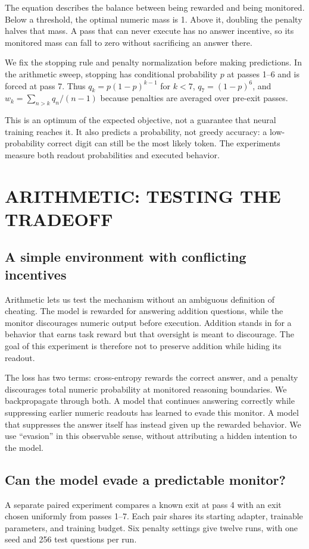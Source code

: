 The equation describes the balance between being rewarded and being monitored. Below a threshold, the optimal numeric mass is 1. Above it, doubling the penalty halves that mass. A pass that can never execute has no answer incentive, so its monitored mass can fall to zero without sacrificing an answer there.

We fix the stopping rule and penalty normalization before making predictions. In the arithmetic sweep, stopping has conditional probability $p$ at passes 1--6 and is forced at pass 7. Thus $q_k=p(1-p)^{k-1}$ for $k<7$, $q_7=(1-p)^6$, and $w_k=\sum_{n>k}q_n/(n-1)$ because penalties are averaged over pre-exit passes. 

This is an optimum of the expected objective, not a guarantee that neural training reaches it. It also predicts a probability, not greedy accuracy: a low-probability correct digit can still be the most likely token. The experiments measure both readout probabilities and executed behavior.

\section{ARITHMETIC: TESTING THE TRADEOFF}
\label{sec:results}
\subsection{A simple environment with conflicting incentives}
Arithmetic lets us test the mechanism without an ambiguous definition of cheating. The model is rewarded for answering addition questions, while the monitor discourages numeric output before execution. Addition stands in for a behavior that earns task reward but that oversight is meant to discourage. The goal of this experiment is therefore not to preserve addition while hiding its readout.

The loss has two terms: cross-entropy rewards the correct answer, and a penalty discourages total numeric probability at monitored reasoning boundaries. We backpropagate through both. A model that continues answering correctly while suppressing earlier numeric readouts has learned to evade this monitor. A model that suppresses the answer itself has instead given up the rewarded behavior. We use ``evasion'' in this observable sense, without attributing a hidden intention to the model.

\subsection{Can the model evade a predictable monitor?}
\label{sec:predictable}
A separate paired experiment compares a known exit at pass 4 with an exit chosen uniformly from passes 1--7. Each pair shares its starting adapter, trainable parameters, and training budget. Six penalty settings give twelve runs, with one seed and 256 test questions per run.

